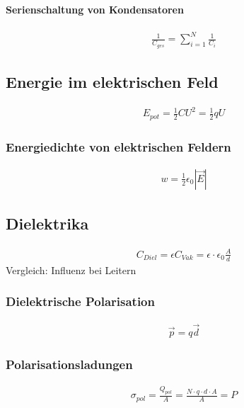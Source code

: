 \paragraph{Serienschaltung von Kondensatoren}
\begin{align} \label{eqn:gesKapazität Serienschaltung}
\boxed{\frac{1}{C_{ges}} = \sum \limits_{i=1}^{N} \frac{1}{C_i}}
\end{align}

\subsection{Energie im elektrischen Feld}
\begin{align} \label{eqn:elektrische Energie}
\boxed{E_{pot} = \tfrac{1}{2} C U^2 = \tfrac{1}{2}qU}
\end{align}
\subsubsection{Energiedichte von elektrischen Feldern}
\begin{align} \label{eqn:Energiedichte}
\boxed{w = \frac{1}{2} \epsilon_0 |\vec{E}|}
\end{align}

\subsection{Dielektrika}
\begin{align} \label{eqn:Dielektrikum Plattenkondensator}
C_{Diel} = \epsilon C_{Vak} = \epsilon \cdot \epsilon_0 \frac{A}{d}
\end{align}
Vergleich: Influenz bei Leitern

\subsubsection{Dielektrische Polarisation}
\begin{align} \label{eqn:Polarisation}
\vec{p} = q \vec{d}
\end{align}

\subsubsection{Polarisationsladungen}
\begin{align} \label{eqn:Polarisationsladung}
\sigma_{pol}= \frac{Q_{pol}}{A} = \frac{N \cdot q \cdot d \cdot A}{A} = P
\end{align}

